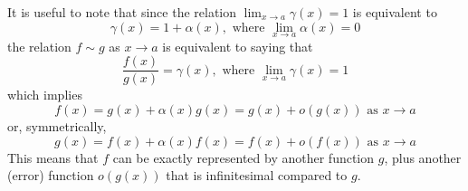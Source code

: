     It is useful to note that since the relation $\lim_{x \rightarrow a} \gamma(x) = 1$ is equivalent to 
    \begin{equation}
      \gamma (x) = 1 + \alpha(x), \text{ where } \lim_{x \rightarrow a} \alpha(x) = 0
    \end{equation}
    the relation $f \sim g$ as $x\rightarrow a$ is equivalent to saying that
    \begin{equation}
      \frac{f(x)}{g(x)} = \gamma(x), \text{ where } \lim_{x \rightarrow a} \gamma(x) = 1
    \end{equation}
    which implies 
    \begin{equation}
      f(x) = g(x) + \alpha(x) g(x) = g(x) + o(g(x)) \text{ as } x \rightarrow a
    \end{equation}
    or, symmetrically, 
    \begin{equation}
      g(x) = f(x) + \alpha(x) f(x) = f(x) + o(f(x)) \text{ as } x \rightarrow a
    \end{equation}
    This means that $f$ can be exactly represented by another function $g$, plus another (error) function $o(g(x))$ that is infinitesimal compared to $g$. 

